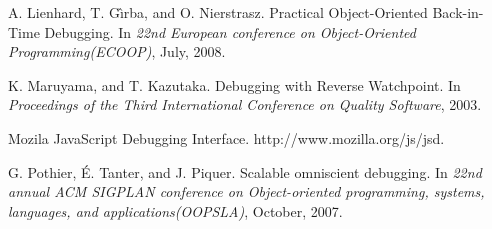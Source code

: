 \documentclass[preprint]{sigplanconf}
\begin{document}
\begin{thebibliography}{13}
A. Lienhard, T. G\^{\i}rba, and O. Nierstrasz. \newblock Practical Object-Oriented Back-in-Time Debugging.
\newblock In \emph{22nd European conference on Object-Oriented Programming(ECOOP)},
July, 2008.

K. Maruyama, and T. Kazutaka. \newblock Debugging with Reverse Watchpoint.
\newblock In \emph{Proceedings of the Third International Conference on Quality Software},
2003.

Mozila JavaScript Debugging Interface. \newblock http://www.mozilla.org/js/jsd.

G. Pothier, \'{E}. Tanter, and J. Piquer. \newblock Scalable omniscient debugging.
\newblock In \emph{22nd annual ACM SIGPLAN conference on Object-oriented programming, systems, languages, and applications(OOPSLA)},
October, 2007.


\end{thebibliography}
\end{document}
